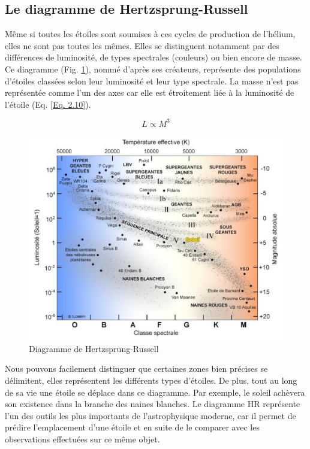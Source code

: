 \subsection{Le diagramme de Hertzsprung-Russell}\label{2.1.3}

Même si toutes les étoiles sont soumises à ces cycles de production de l’hélium, elles ne sont pas toutes les mêmes. Elles se distinguent notamment par des différences de luminosité, de types spectrales (couleurs) ou bien encore de masse. Ce diagramme (Fig. \ref{Fig. 2.2}), nommé d’après ses créateurs, représente des populations d’étoiles classées selon leur luminosité et leur type spectrale. La masse n’est pas représentée comme l’un des axes car elle est étroitement liée à la luminosité de l’étoile (Eq. \ref{Eq. 2.10}).

\begin{equation}L \propto M^{3}\label{Eq. 2.10}\end{equation}\newpage

\begin{figure}[H]\vspace{1cm}
	\centering
	\includegraphics[scale=0.4]{images/hr-diagram}
	\caption[Diagramme de Hertzsprung-Russell\newline\url{http://www.astrosurf.com/luxorion/vie-etoiles2.html}]{Diagramme de Hertzsprung-Russell}
	\label{Fig. 2.2}
\end{figure}\bigskip

Nous pouvons facilement distinguer que certaines zones bien précises se délimitent, elles représentent les différents types d’étoiles. De plus, tout au long de sa vie une étoile se déplace dans ce diagramme. Par exemple, le soleil achèvera son existence dans la branche des naines blanches. Le diagramme HR représente l’un des outils les plus importants de l’astrophysique moderne, car il permet de prédire l’emplacement d’une étoile et en suite de le comparer avec les observations effectuées sur ce même objet.\bigskip

